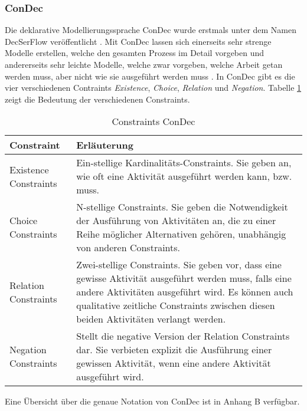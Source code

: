 \subsubsection{ConDec}

Die deklarative Modellierungssprache ConDec wurde erstmals unter dem Namen DecSerFlow veröffentlicht \cite{fahland2010}. Mit ConDec lassen sich einerseits sehr strenge Modelle erstellen, welche den gesamten Prozess im Detail vorgeben und andererseits sehr leichte Modelle, welche zwar vorgeben, welche Arbeit getan werden muss, aber nicht wie sie ausgeführt werden muss \cite{pesic2006}. \newline
In ConDec gibt es die vier verschiedenen Contraints \textit{Existence}, \textit{Choice}, \textit{Relation} und \textit{Negation}. Tabelle \ref{tab:tab3} zeigt die Bedeutung der verschiedenen Constraints. \newline

\begin{table}
\begin{tabular}{|p{}|p{}|}
\hline
\textbf{Constraint} & \textbf{Erläuterung}\\
\hline
Existence Constraints & Ein-stellige Kardinalitäts-Constraints. Sie geben an, wie oft eine Aktivität ausgeführt werden kann, bzw. muss.\\
\hline
Choice Constraints & N-stellige Constraints. Sie geben die Notwendigkeit der Ausführung von Aktivitäten an, die zu einer Reihe möglicher Alternativen gehören, unabhängig von anderen Constraints. \\
\hline
Relation Constraints & Zwei-stellige Constraints. Sie geben vor, dass eine gewisse Aktivität ausgeführt werden muss, falls eine andere Aktivitäten ausgeführt wird. Es können auch qualitative zeitliche Constraints zwischen diesen beiden Aktivitäten verlangt werden.\\
\hline
Negation Constraints & Stellt die negative Version der Relation Constraints dar. Sie verbieten explizit die Ausführung einer gewissen Aktivität, wenn eine andere Aktivität ausgeführt wird.\\
\hline
 \end{tabular}
  \caption{Constraints ConDec}
\label{tab:tab3}
 \end{table}
 
 Eine Übersicht über die genaue Notation von ConDec ist in Anhang B verfügbar.
 







